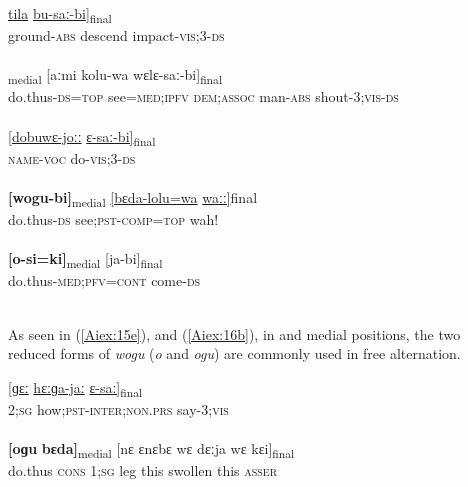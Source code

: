 \documentclass[output=paper]{LSP/langsci}
\begin{document}
\begin{exe}
\ex \label{Aiex:15ae}
\begin{xlist}
\ex \label{Aiex:15a}
\gll \underline{\smash{[isa-jaː}}	\underline{tila}	\underline{bu-saː-bi}]\textsubscript{final}\\
ground-\textsc{abs}	descend	impact-\textsc{vis;3-ds}\\
\glt	{}\\
\ex \label{Aiex:15b}
\gll	[\textbf{[wogu-bi=jaː]}\textsubscript{topic}	bɛda=nɛgɛː]\textsubscript{medial}	[aːmi	kolu-wa	wɛlɛ-saː-bi]\textsubscript{final}\\
do.thus-\textsc{ds=top}	see=\textsc{med;ipfv}	\textsc{dem;assoc}	man-\textsc{abs}	shout-\textsc{3;vis-ds}\\
\glt	{}\\
\ex \label{Aiex:15c}
\gll	\underline{[dobuwɛ-joːː}	\underline{ɛ-saː-bi]}\textsubscript{final}\\
\textsc{name-voc}	do-\textsc{vis;3-ds}\\
\glt	{}\\
\ex \label{Aiex:15d}
\gll	\textbf{[wogu-bi]}\textsubscript{medial}	\underline{[bɛda-lolu=wa}	\underline{waːː]}{final}\\
do.thus-\textsc{ds}	see\textsc{;pst-comp=top}	wah!\\
\glt	{}\\
\ex \label{Aiex:15e}
\gll	\textbf{[o-si=ki]}\textsubscript{medial}	[ja-bi]\textsubscript{final}\\
do.thus\textsc{-med;pfv=cont}	come-\textsc{ds}\\
\glt	{}\\
\end{xlist}
\end{exe}

As seen in (\ref{Aiex:15e}), and (\ref{Aiex:16b}), in  and medial positions, the two reduced forms of \textit{wogu} (\textit{o} and \textit{ogu}) are commonly used in free alternation.

\begin{exe}
\ex \label{Aiex:16ab}
\begin{xlist}
\ex \label{Aiex:16a}
\gll \underline{[ɡɛː}	\underline{hɛːɡa-jaː}	\underline{ɛ-saː]}\textsubscript{final}\\
\textsc{2;sg}	how\textsc{;pst-inter;non.prs}	say-\textsc{3;vis}\\
\glt {}\\
\ex \label{Aiex:16b}
\gll \textbf{[oɡu}	\textbf{bɛda]}\textsubscript{medial}	[nɛ	ɛnɛbɛ	wɛ	dɛːja	wɛ	kɛi]\textsubscript{final}\\
do.thus	\textsc{cons}	\textsc{1;sg}	leg	this	swollen	this	\textsc{asser}\\
\glt {}\\
\end{xlist}
\end{exe}
\end{document}
